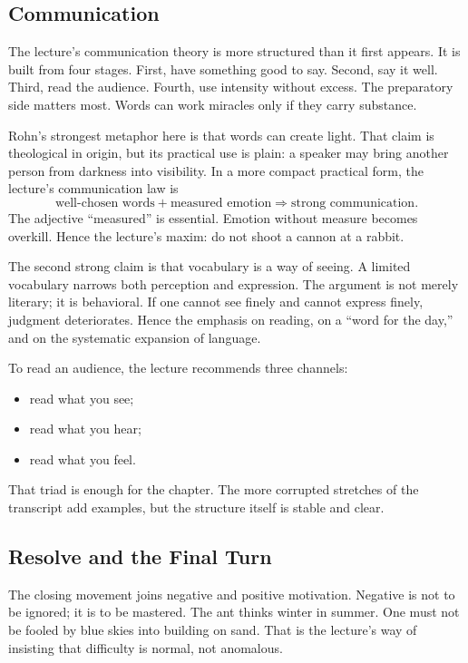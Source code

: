 \subsection{Communication}

The lecture's communication theory is more structured than it first appears. It is built from four stages. First, have something good to say. Second, say it well. Third, read the audience. Fourth, use intensity without excess. The preparatory side matters most. Words can work miracles only if they carry substance.

Rohn's strongest metaphor here is that words can create light. That claim is theological in origin, but its practical use is plain: a speaker may bring another person from darkness into visibility. In a more compact practical form, the lecture's communication law is
\begin{equation}
\text{well-chosen words}+\text{measured emotion}\Rightarrow \text{strong communication}.
\end{equation}
The adjective ``measured'' is essential. Emotion without measure becomes overkill. Hence the lecture's maxim: do not shoot a cannon at a rabbit.

The second strong claim is that vocabulary is a way of seeing. A limited vocabulary narrows both perception and expression. The argument is not merely literary; it is behavioral. If one cannot see finely and cannot express finely, judgment deteriorates. Hence the emphasis on reading, on a ``word for the day,'' and on the systematic expansion of language.

To read an audience, the lecture recommends three channels:
\begin{itemize}
\item read what you see;
\item read what you hear;
\item read what you feel.
\end{itemize}
That triad is enough for the chapter. The more corrupted stretches of the transcript add examples, but the structure itself is stable and clear.

\subsection{Resolve and the Final Turn}

The closing movement joins negative and positive motivation. Negative is not to be ignored; it is to be mastered. The ant thinks winter in summer. One must not be fooled by blue skies into building on sand. That is the lecture's way of insisting that difficulty is normal, not anomalous.

